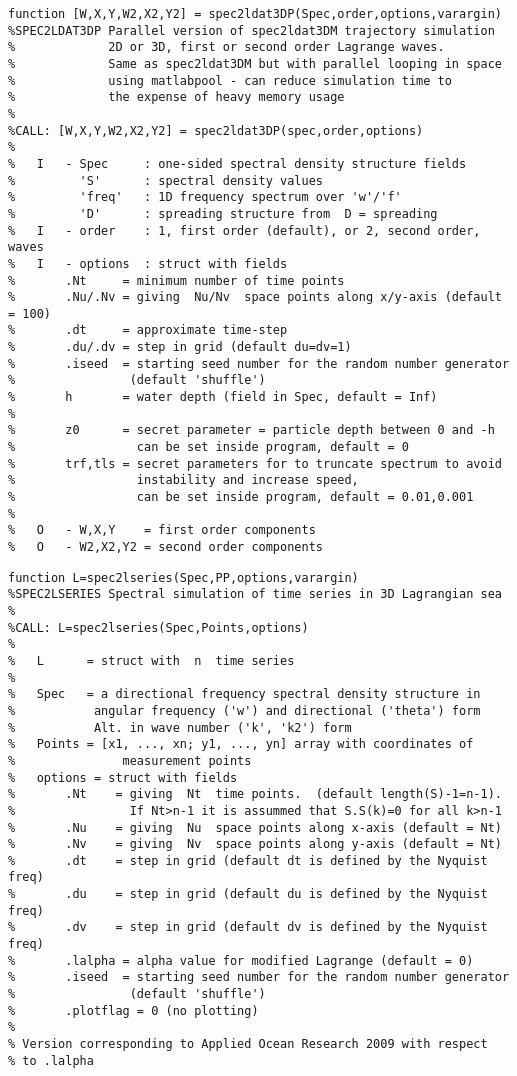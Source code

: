 {\begin{verbatim}
function [W,X,Y,W2,X2,Y2] = spec2ldat3DP(Spec,order,options,varargin)
%SPEC2LDAT3DP Parallel version of spec2ldat3DM trajectory simulation
%             2D or 3D, first or second order Lagrange waves.
%             Same as spec2ldat3DM but with parallel looping in space 
%             using matlabpool - can reduce simulation time to 
%             the expense of heavy memory usage
%
%CALL: [W,X,Y,W2,X2,Y2] = spec2ldat3DP(spec,order,options) 
%
%   I   - Spec     : one-sided spectral density structure fields 
%         'S'      : spectral density values
%         'freq'   : 1D frequency spectrum over 'w'/'f'
%         'D'      : spreading structure from  D = spreading
%   I   - order    : 1, first order (default), or 2, second order, waves 
%   I   - options  : struct with fields 
%       .Nt     = minimum number of time points
%       .Nu/.Nv = giving  Nu/Nv  space points along x/y-axis (default = 100)
%       .dt     = approximate time-step  
%       .du/.dv = step in grid (default du=dv=1)
%       .iseed  = starting seed number for the random number generator 
%                (default 'shuffle')
%       h       = water depth (field in Spec, default = Inf)
%
%       z0      = secret parameter = particle depth between 0 and -h
%                 can be set inside program, default = 0
%       trf,tls = secret parameters for to truncate spectrum to avoid 
%                 instability and increase speed, 
%                 can be set inside program, default = 0.01,0.001
%
%   O   - W,X,Y    = first order components
%   O   - W2,X2,Y2 = second order components
\end{verbatim}
\clearpage

\begin{verbatim}
function L=spec2lseries(Spec,PP,options,varargin)
%SPEC2LSERIES Spectral simulation of time series in 3D Lagrangian sea 
%
%CALL: L=spec2lseries(Spec,Points,options)
%
%   L      = struct with  n  time series
%   
%   Spec   = a directional frequency spectral density structure in 
%           angular frequency ('w') and directional ('theta') form
%           Alt. in wave number ('k', 'k2') form
%   Points = [x1, ..., xn; y1, ..., yn] array with coordinates of 
%               measurement points
%   options = struct with fields 
%       .Nt    = giving  Nt  time points.  (default length(S)-1=n-1).
%                If Nt>n-1 it is assummed that S.S(k)=0 for all k>n-1
%       .Nu    = giving  Nu  space points along x-axis (default = Nt)
%       .Nv    = giving  Nv  space points along y-axis (default = Nt)
%       .dt    = step in grid (default dt is defined by the Nyquist freq) 
%       .du    = step in grid (default du is defined by the Nyquist freq)
%       .dv    = step in grid (default dv is defined by the Nyquist freq)
%       .lalpha = alpha value for modified Lagrange (default = 0)
%       .iseed  = starting seed number for the random number generator 
%                (default 'shuffle')
%       .plotflag = 0 (no plotting)
%
% Version corresponding to Applied Ocean Research 2009 with respect 
% to .lalpha 
\end{verbatim}
\clearpage

}
